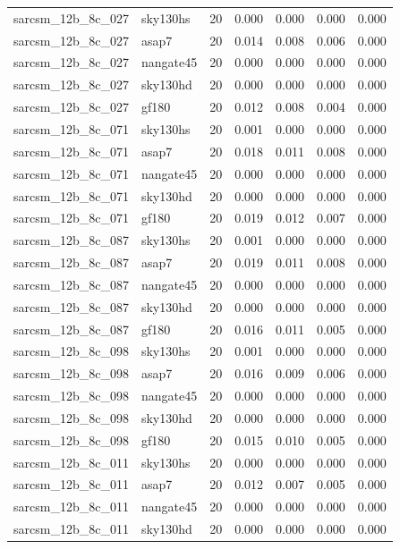 \begin{tabular}{llrrrrr}
sarcsm\_12b\_8c\_027 & sky130hs & 20 & 0.000 & 0.000 & 0.000 & 0.000 \\
sarcsm\_12b\_8c\_027 & asap7 & 20 & 0.014 & 0.008 & 0.006 & 0.000 \\
sarcsm\_12b\_8c\_027 & nangate45 & 20 & 0.000 & 0.000 & 0.000 & 0.000 \\
sarcsm\_12b\_8c\_027 & sky130hd & 20 & 0.000 & 0.000 & 0.000 & 0.000 \\
sarcsm\_12b\_8c\_027 & gf180 & 20 & 0.012 & 0.008 & 0.004 & 0.000 \\
sarcsm\_12b\_8c\_071 & sky130hs & 20 & 0.001 & 0.000 & 0.000 & 0.000 \\
sarcsm\_12b\_8c\_071 & asap7 & 20 & 0.018 & 0.011 & 0.008 & 0.000 \\
sarcsm\_12b\_8c\_071 & nangate45 & 20 & 0.000 & 0.000 & 0.000 & 0.000 \\
sarcsm\_12b\_8c\_071 & sky130hd & 20 & 0.000 & 0.000 & 0.000 & 0.000 \\
sarcsm\_12b\_8c\_071 & gf180 & 20 & 0.019 & 0.012 & 0.007 & 0.000 \\
sarcsm\_12b\_8c\_087 & sky130hs & 20 & 0.001 & 0.000 & 0.000 & 0.000 \\
sarcsm\_12b\_8c\_087 & asap7 & 20 & 0.019 & 0.011 & 0.008 & 0.000 \\
sarcsm\_12b\_8c\_087 & nangate45 & 20 & 0.000 & 0.000 & 0.000 & 0.000 \\
sarcsm\_12b\_8c\_087 & sky130hd & 20 & 0.000 & 0.000 & 0.000 & 0.000 \\
sarcsm\_12b\_8c\_087 & gf180 & 20 & 0.016 & 0.011 & 0.005 & 0.000 \\
sarcsm\_12b\_8c\_098 & sky130hs & 20 & 0.001 & 0.000 & 0.000 & 0.000 \\
sarcsm\_12b\_8c\_098 & asap7 & 20 & 0.016 & 0.009 & 0.006 & 0.000 \\
sarcsm\_12b\_8c\_098 & nangate45 & 20 & 0.000 & 0.000 & 0.000 & 0.000 \\
sarcsm\_12b\_8c\_098 & sky130hd & 20 & 0.000 & 0.000 & 0.000 & 0.000 \\
sarcsm\_12b\_8c\_098 & gf180 & 20 & 0.015 & 0.010 & 0.005 & 0.000 \\
sarcsm\_12b\_8c\_011 & sky130hs & 20 & 0.000 & 0.000 & 0.000 & 0.000 \\
sarcsm\_12b\_8c\_011 & asap7 & 20 & 0.012 & 0.007 & 0.005 & 0.000 \\
sarcsm\_12b\_8c\_011 & nangate45 & 20 & 0.000 & 0.000 & 0.000 & 0.000 \\
sarcsm\_12b\_8c\_011 & sky130hd & 20 & 0.000 & 0.000 & 0.000 & 0.000 \\

\end{tabular}
